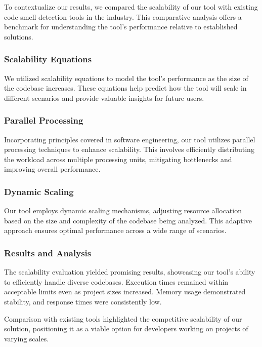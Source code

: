 \documentclass[journal]{IEEEtran}
\begin{document}
To contextualize our results, we compared the scalability of our tool with existing code smell detection tools in the industry. This comparative analysis offers a benchmark for understanding the tool's performance relative to established solutions.

\subsubsection{Scalability Equations}

We utilized scalability equations to model the tool's performance as the size of the codebase increases. These equations help predict how the tool will scale in different scenarios and provide valuable insights for future users.

\subsubsection{Parallel Processing}

Incorporating principles covered in software engineering, our tool utilizes parallel processing techniques to enhance scalability. This involves efficiently distributing the workload across multiple processing units, mitigating bottlenecks and improving overall performance.

\subsubsection{Dynamic Scaling}

Our tool employs dynamic scaling mechanisms, adjusting resource allocation based on the size and complexity of the codebase being analyzed. This adaptive approach ensures optimal performance across a wide range of scenarios.

\subsubsection{Results and Analysis}

The scalability evaluation yielded promising results, showcasing our tool's ability to efficiently handle diverse codebases. Execution times remained within acceptable limits even as project sizes increased. Memory usage demonstrated stability, and response times were consistently low.

Comparison with existing tools highlighted the competitive scalability of our solution, positioning it as a viable option for developers working on projects of varying scales.
\end{document}
